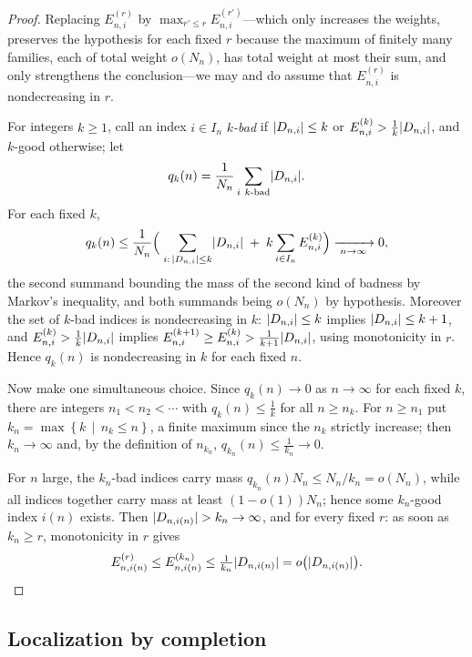 \documentclass[11pt]{amsart}
\theoremstyle{definition}
\theoremstyle{plain}
\DeclarePairedDelimiter{\abs}{\lvert}{\rvert}
\newcommand{\set}[1]{\left\{#1\right\}}
\newcommand{\suchthat}{\,\middle|\,}
\begin{document}
\begin{proof}
Replacing \(E^{(r)}_{n,i}\) by \(\max_{r'\leq r}E^{(r')}_{n,i}\)---which only increases the weights, preserves the hypothesis for each fixed \(r\) because the maximum of finitely many families, each of total weight \(o(N_n)\), has total weight at most their sum, and only strengthens the conclusion---we may and do assume that \(E^{(r)}_{n,i}\) is nondecreasing in \(r\).

For integers \(k\geq1\), call an index \(i\in I_n\) \emph{\(k\)-bad} if \(\abs{D_{n,i}}\leq k\) or \(E^{(k)}_{n,i}>\tfrac1k\abs{D_{n,i}}\), and \(k\)-good otherwise; let
\[
 q_k(n)=\frac{1}{N_n}\sum_{i\ k\text{-bad}}\abs{D_{n,i}} .
\]
For each fixed \(k\),
\[
 q_k(n)\leq\frac{1}{N_n}\Bigl(\;\sum_{i:\,\abs{D_{n,i}}\leq k}\abs{D_{n,i}}\;+\;k\sum_{i\in I_n}E^{(k)}_{n,i}\Bigr)\xrightarrow[\;n\to\infty\;]{}0,
\]
the second summand bounding the mass of the second kind of badness by Markov's inequality, and both summands being \(o(N_n)\) by hypothesis.  Moreover the set of \(k\)-bad indices is nondecreasing in \(k\): \(\abs{D_{n,i}}\leq k\) implies \(\abs{D_{n,i}}\leq k+1\), and \(E^{(k)}_{n,i}>\tfrac1k\abs{D_{n,i}}\) implies \(E^{(k+1)}_{n,i}\geq E^{(k)}_{n,i}>\tfrac1{k+1}\abs{D_{n,i}}\), using monotonicity in \(r\).  Hence \(q_k(n)\) is nondecreasing in \(k\) for each fixed \(n\).

Now make one simultaneous choice.  Since \(q_k(n)\to0\) as \(n\to\infty\) for each fixed \(k\), there are integers \(n_1<n_2<\cdots\) with \(q_k(n)\leq\tfrac1k\) for all \(n\geq n_k\).  For \(n\geq n_1\) put \(k_n=\max\set{k\suchthat n_k\leq n}\), a finite maximum since the \(n_k\) strictly increase; then \(k_n\to\infty\) and, by the definition of \(n_{k_n}\), \(q_{k_n}(n)\leq\tfrac1{k_n}\to0\).

For \(n\) large, the \(k_n\)-bad indices carry mass \(q_{k_n}(n)N_n\leq N_n/k_n=o(N_n)\), while all indices together carry mass at least \((1-o(1))N_n\); hence some \(k_n\)-good index \(i(n)\) exists.  Then \(\abs{D_{n,i(n)}}>k_n\to\infty\), and for every fixed \(r\): as soon as \(k_n\geq r\), monotonicity in \(r\) gives
\[
 E^{(r)}_{n,i(n)}\leq E^{(k_n)}_{n,i(n)}\leq\tfrac1{k_n}\abs{D_{n,i(n)}}=o\bigl(\abs{D_{n,i(n)}}\bigr).\qedhere
\]
\end{proof}

\subsection{Localization by completion}
\end{document}
